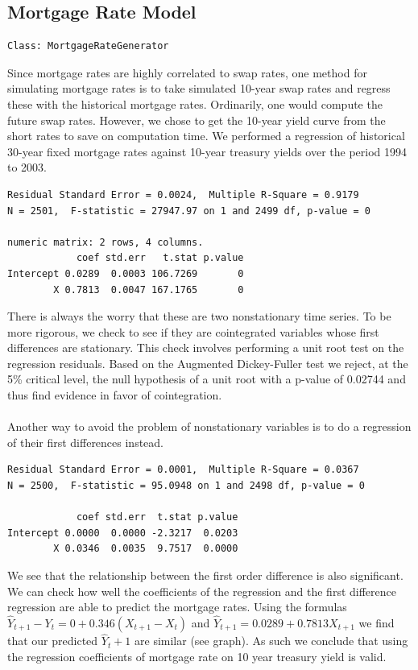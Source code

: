 \documentclass[10pt,letterpaper]{article}
\begin{document}
\subsection{Mortgage Rate Model}
\begin{verbatim}
Class: MortgageRateGenerator
\end{verbatim}
Since mortgage rates are highly correlated to swap rates, one method for simulating mortgage rates is to take simulated 10-year swap rates and regress these with the historical mortgage rates. Ordinarily, one would compute the future swap rates. However, we chose to get the 10-year yield curve from the short rates to save on computation time. We performed a regression of historical 30-year fixed mortgage rates against 10-year treasury yields over the period 1994 to 2003.
\begin{verbatim}
Residual Standard Error = 0.0024,  Multiple R-Square = 0.9179
N = 2501,  F-statistic = 27947.97 on 1 and 2499 df, p-value = 0

numeric matrix: 2 rows, 4 columns. 
            coef std.err   t.stat p.value 
Intercept 0.0289  0.0003 106.7269       0
        X 0.7813  0.0047 167.1765       0
\end{verbatim}
There is always the worry that these are two nonstationary time series. To be more rigorous, we check to see if they are cointegrated variables whose first differences are stationary. This check involves performing a unit root test on the regression residuals. Based on the Augmented Dickey-Fuller test we reject, at the 5\% critical level, the null hypothesis of a unit root with a p-value of 0.02744 and thus find evidence in favor of cointegration.\\
\\
Another way to avoid the problem of nonstationary variables is to do a regression of their first differences instead.
\begin{verbatim}
Residual Standard Error = 0.0001,  Multiple R-Square = 0.0367
N = 2500,  F-statistic = 95.0948 on 1 and 2498 df, p-value = 0

            coef std.err  t.stat p.value 
Intercept 0.0000  0.0000 -2.3217  0.0203
        X 0.0346  0.0035  9.7517  0.0000
\end{verbatim}
We see that the relationship between the first order difference is also significant. We can check how well the coefficients of the regression and the first difference regression are able to predict the mortgage rates. Using the formulas $\hat{Y}_{t+1} - Y_{t} = 0 + 0.346 (X_{t+1}-X_{t})$ and $\hat{Y}_{t+1} = 0.0289 + 0.7813X_{t+1}$ we find that our predicted $\hat{Y}_t+1$ are similar (see graph). As such we conclude that using the regression coefficients of mortgage rate on 10 year treasury yield is valid. \\
\end{document}
